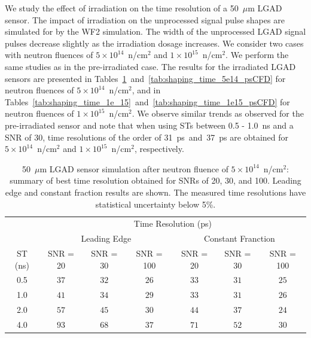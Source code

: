 \documentclass[preprint,1p]{elsarticle}
\begin{document}
We study the effect of irradiation on the time resolution of a 50~$\mu$m LGAD sensor. The impact of irradiation on the unprocessed signal pulse shapes are simulated for by the WF2 simulation. The width of the unprocessed
LGAD signal pulses decrease slightly as the irradiation dosage increases. We consider two
cases with neutron fluences of $5\times 10^{14}$~n/cm$^2$ and 
$1\times 10^{15}$~n/cm$^2$. We perform the same studies as in the pre-irradiated case. 
The results for the irradiated LGAD sensors are presented in 
Tables~\ref{tab:shaping_time_5e14}~and~\ref{tab:shaping_time_5e14_psCFD} for 
neutron fluences of $5\times 10^{14}$~n/cm$^2$, and in 
Tables~\ref{tab:shaping_time_1e_15}~and~\ref{tab:shaping_time_1e15_psCFD} for neutron
fluences of $1\times 10^{15}$~n/cm$^2$.
We observe similar trends as observed for the pre-irradiated sensor and note that when 
using STs between 0.5 - 1.0~\si{ns} and a SNR of 30, time resolutions of the order
of 31~\si{ps}~and~37~\si{ps} are obtained for $5\times 10^{14}$~n/cm$^2$ and 
$1\times 10^{15}$~n/cm$^2$, respectively.





 \begin{table}
     \begin{tabular}{c|ccc|ccc}
     \multicolumn{1}{c}{}& \multicolumn{6}{c}{Time Resolution (ps)} \\
     \multicolumn{1}{c}{}&\multicolumn{3}{c}{Leading Edge} & \multicolumn{3}{c}{Constant Franction}\\ \hline
     ST (ns) & SNR = 20   & SNR = 30      & SNR = 100     & SNR = 20      & SNR = 30      & SNR = 100 \\
     0.5 & $37$  & $32$  & $26$  & $33$  & $31$  & $25$ \\
     1.0 & $41$  & $34$  & $29$  & $33$  & $31$  & $26$ \\
     2.0 & $57$  & $45$  & $30$  & $44$  & $37$  & $24$ \\
     4.0 & $93$  & $68$  & $37$  & $71$  & $52$  & $30$ \\
     \end{tabular}
     \caption{50~$\mu$m LGAD sensor simulation after neutron fluence of
      $5\times 10^{14}$~n/cm$^2$: summary of best time resolution obtained for SNRs
     of 20, 30, and 100. Leading edge and constant fraction results are shown. The measured time resolutions
    have statistical uncertainty below 5\%.}
\label{tab:shaping_time_5e14}
  \end{table}
\end{document}
